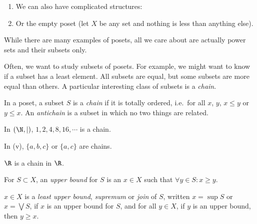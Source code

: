 \documentclass[a4paper]{article}
\begin{document}
\begin{eg}
\begin{enumerate}
\begin{center}
      \end{center}
    \item We can also have complicated structures:
      \begin{center}
      \end{center}
    \item Or the empty poset (let $X$ be any set and nothing is less than anything else).
  \end{enumerate}
\end{eg}
While there are many examples of posets, all we care about are actually power sets and their subsets only.

Often, we want to study subsets of posets. For example, we might want to know if a subset has a least element. All subsets are equal, but some subsets are more equal than others. A particular interesting class of subsets is a \emph{chain}.
\begin{defi}
  In a poset, a subset $S$ is a \emph{chain} if it is totally ordered, i.e.\ for all $x$, $y$, $x\leq y$ or $y\leq x$. An \emph{antichain} is a subset in which no two things are related.
\end{defi}

\begin{eg}
  In $(\N, \mid )$, $1, 2, 4, 8, 16, \cdots$ is a chain.

  In (v), $\{a, b, c\}$ or $\{a, c\}$ are chains.

  $\R$ is a chain in $\R$.
\end{eg}

\begin{defi}
  For $S\subset X$, an \emph{upper bound} for $S$ is an $x\in X$ such that $\forall y\in S: x \geq y$.

  $x\in X$ is a \emph{least upper bound}, \emph{supremum} or \emph{join} of $S$, written $x = \sup S$ or $x = \bigvee S$, if $x$ is an upper bound for $S$, and for all $y \in X$, if $y$ is an upper bound, then $y \geq x$.
\end{defi}
\end{document}
